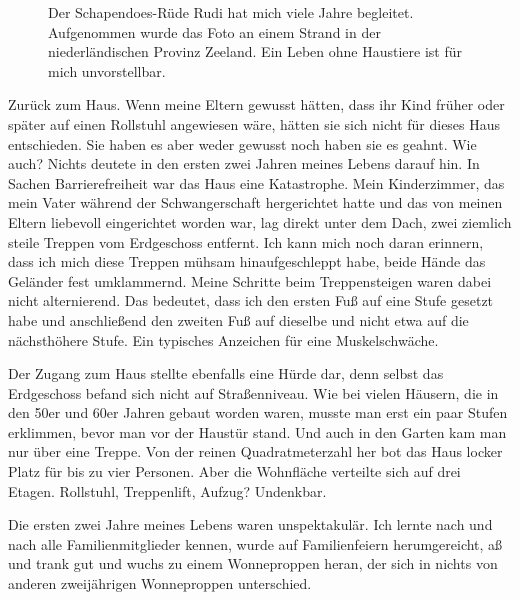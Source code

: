 \documentclass[fontsize=14pt,a4paper,headinclude,DIV=calc,automark]{scrbook}
\begin{document}
\setlength{\fboxsep}{0pt}    %
\setlength{\fboxrule}{0.2pt} %
\begin{figure}[ht]
    \centering
    \caption{Der Schapendoes-Rüde Rudi hat mich viele Jahre begleitet. Aufgenommen wurde das Foto an einem Strand in der niederländischen Provinz Zeeland. Ein Leben ohne Haustiere ist für mich unvorstellbar.}
    \label{fig:zeltgemeinschaft}
\end{figure}

Zurück zum Haus. Wenn meine Eltern gewusst hätten, dass ihr Kind früher oder später auf einen Rollstuhl angewiesen wäre, hätten sie sich nicht für dieses Haus entschieden. Sie haben es aber weder gewusst noch haben sie es geahnt. Wie auch? Nichts deutete in den ersten zwei Jahren meines Lebens darauf hin. In Sachen Barrierefreiheit war das Haus eine Katastrophe. Mein Kinderzimmer, das mein Vater während der Schwangerschaft hergerichtet hatte und das von meinen Eltern liebevoll eingerichtet worden war, lag direkt unter dem Dach, zwei ziemlich steile Treppen vom Erdgeschoss entfernt. Ich kann mich noch daran erinnern, dass ich mich diese Treppen mühsam hinaufgeschleppt habe, beide Hände das Geländer fest umklammernd. Meine Schritte beim Treppensteigen waren dabei nicht alternierend. Das bedeutet, dass ich den ersten Fuß auf eine Stufe gesetzt habe und anschließend den zweiten Fuß auf dieselbe und nicht etwa auf die nächsthöhere Stufe. Ein typisches Anzeichen für eine Muskelschwäche.

Der Zugang zum Haus stellte ebenfalls eine Hürde dar, denn selbst das Erdgeschoss befand sich nicht auf Straßenniveau. Wie bei vielen Häusern, die in den 50er und 60er Jahren gebaut worden waren, musste man erst ein paar Stufen erklimmen, bevor man vor der Haustür stand. Und auch in den Garten kam man nur über eine Treppe. Von der reinen Quadratmeterzahl her bot das Haus locker Platz für bis zu vier Personen. Aber die Wohnfläche verteilte sich auf drei Etagen. Rollstuhl, Treppenlift, Aufzug? Undenkbar.

Die ersten zwei Jahre meines Lebens waren unspektakulär. Ich lernte nach und nach alle Familienmitglieder kennen, wurde auf Familienfeiern herumgereicht, aß und trank gut und wuchs zu einem Wonneproppen heran, der sich in nichts von anderen zweijährigen Wonneproppen unterschied.

\vspace{0.5\baselineskip}
\end{document}
